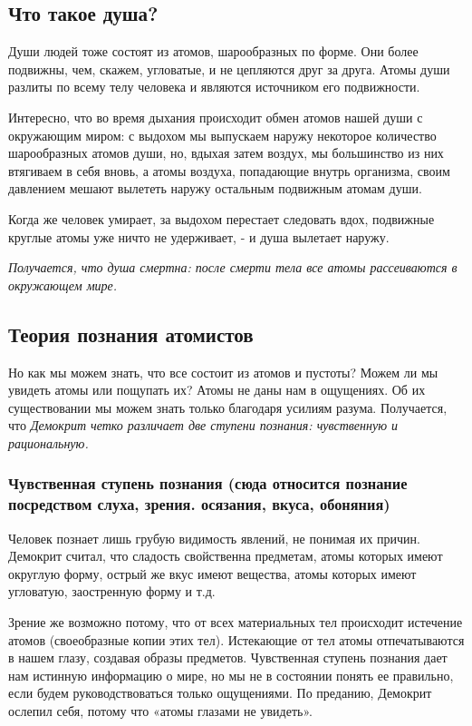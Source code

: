 \documentclass[a4paper, 14pt]{extreport}
\begin{document}
\subsection{Что такое душа?}

Души людей тоже состоят из атомов, шарообразных по форме. Они более
подвижны, чем, скажем, угловатые, и не цепляются друг за друга. Атомы
души разлиты по всему телу человека и являются источником его
подвижности.

Интересно, что во время дыхания происходит обмен атомов нашей души с
окружающим миром: с выдохом мы выпускаем наружу некоторое количество
шарообразных атомов души, но, вдыхая затем воздух, мы большинство из них
втягиваем в себя вновь, а атомы воздуха, попадающие внутрь организма,
своим давлением мешают вылететь наружу остальным подвижным атомам души.

Когда же человек умирает, за выдохом перестает следовать вдох, подвижные
круглые атомы уже ничто не удерживает, - и душа вылетает наружу.

\emph{Получается, что душа смертна: после смерти тела все атомы
рассеиваются в окружающем мире.}

\subsection{Теория познания атомистов}

Но как мы можем знать, что все состоит из атомов и пустоты? Можем ли мы
увидеть атомы или пощупать их? Атомы не даны нам в ощущениях. Об их
существовании мы можем знать только благодаря усилиям разума.
Получается, что \emph{Демокрит четко различает две ступени познания:
чувственную и рациональную.}

\subsubsection{Чувственная ступень познания (сюда относится познание
посредством слуха, зрения. осязания, вкуса, обоняния)}

Человек познает лишь грубую видимость явлений, не понимая их причин.
Демокрит считал, что сладость свойственна предметам, атомы которых имеют
округлую форму, острый же вкус имеют вещества, атомы которых имеют
угловатую, заостренную форму и т.д.

Зрение же возможно потому, что от всех материальных тел происходит
истечение атомов (своеобразные копии этих тел). Истекающие от тел атомы
отпечатываются в нашем глазу, создавая образы предметов. Чувственная
ступень познания дает нам истинную информацию о мире, но мы не в
состоянии понять ее правильно, если будем руководствоваться только
ощущениями. По преданию, Демокрит ослепил себя, потому что «атомы
глазами не увидеть».
\end{document}
